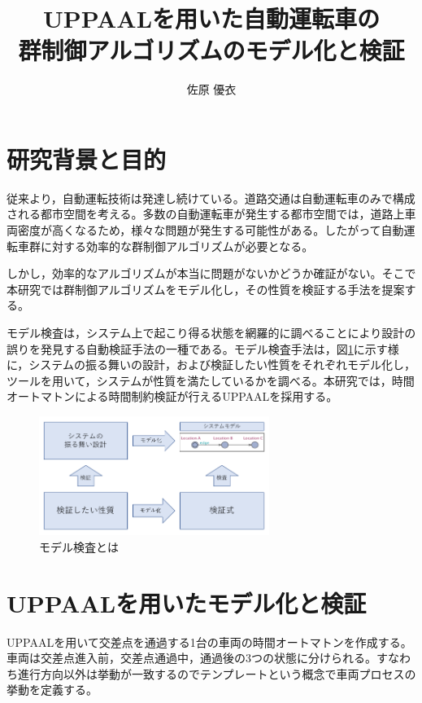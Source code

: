 \documentclass[10pt]{tpu-abst-utf}
\author{佐原 優衣}
\title{UPPAALを用いた自動運転車の\\群制御アルゴリズムのモデル化と検証}
\begin{document}
%
\maketitle
%
%
\section{研究背景と目的}
従来より，自動運転技術は発達し続けている。道路交通は自動運転車のみで構成される都市空間を考える。多数の自動運転車が発生する都市空間では，道路上車両密度が高くなるため，様々な問題が発生する可能性がある。したがって自動運転車群に対する効率的な群制御アルゴリズムが必要となる。
	
しかし，効率的なアルゴリズムが本当に問題がないかどうか確証がない。そこで本研究では群制御アルゴリズムをモデル化し，その性質を検証する手法を提案する。

モデル検査は，システム上で起こり得る状態を網羅的に調べることにより設計の誤りを発見する自動検証手法の一種である。モデル検査手法は，図\ref{ModelV}に示す様に，システムの振る舞いの設計，および検証したい性質をそれぞれモデル化し，ツールを用いて，システムが性質を満たしているかを調べる。本研究では，時間オートマトンによる時間制約検証が行えるUPPAALを採用する。
	\begin{figure}[htbp]
	\centering
	\includegraphics[width=75mm]{ModelVerification.png}
	\caption{モデル検査とは}
	\label{ModelV}
	\end{figure}
\section{UPPAALを用いたモデル化と検証}
UPPAALを用いて交差点を通過する1台の車両の時間オートマトンを作成する。
車両は交差点進入前，交差点通過中，通過後の3つの状態に分けられる。すなわち進行方向以外は挙動が一致するのでテンプレートという概念で車両プロセスの挙動を定義する。
\end{document}
